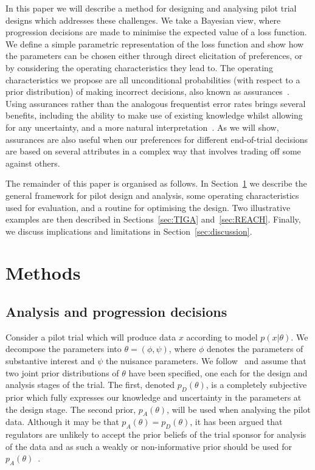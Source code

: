 \documentclass{article} %
\begin{document}
In this paper we will describe a method for designing and analysing pilot trial designs which addresses these challenges. We take a Bayesian view, where progression decisions are made to minimise the expected value of a loss function. We define a simple parametric representation of the loss function and show how the parameters can be chosen either through direct elicitation of preferences, or by considering the operating characteristics they lead to. The operating characteristics we propose are all unconditional probabilities (with respect to a prior distribution) of making incorrect decisions, also known as assurances~\cite{OHagan2005}. Using assurances rather than the analogous frequentist error rates brings several benefits, including the ability to make use of existing knowledge whilst allowing for any uncertainty, and a more natural interpretation~\cite{Crisp2018}. As we will show, assurances are also useful when our preferences for different end-of-trial decisions are based on several attributes in a complex way that involves trading off some against others.


The remainder of this paper is organised as follows. In Section~\ref{sec:methods} we describe the general framework for pilot design and analysis, some operating characteristics used for evaluation, and a routine for optimising the design. Two illustrative examples are then described in Sections~\ref{sec:TIGA} and~\ref{sec:REACH}. Finally, we discuss implications and limitations in Section~\ref{sec:discussion}.

\section{Methods}\label{sec:methods}

\subsection{Analysis and progression decisions}\label{sec:analysis}

Consider a pilot trial which will produce data $x$ according to model $p(x | \theta)$. We decompose the parameters into $\theta = (\phi, \psi)$, where $\phi$ denotes the parameters of substantive interest and $\psi$ the nuisance parameters. We follow~\cite{Wang2002} and assume that two joint prior distributions of $\theta$ have been specified, one each for the design and analysis stages of the trial. The first, denoted $p_{D}(\theta)$, is a completely subjective prior which fully expresses our knowledge and uncertainty in the parameters at the design stage. The second prior, $p_A(\theta)$, will be used when analysing the pilot data. Although it may be that $p_A(\theta) = p_D(\theta)$, it has been argued that regulators are unlikely to accept the prior beliefs of the trial sponsor for analysis of the data and as such a weakly or non-informative prior should be used for $p_A(\theta)$~\cite{OHagan2005, Walley2015}.
\end{document}
